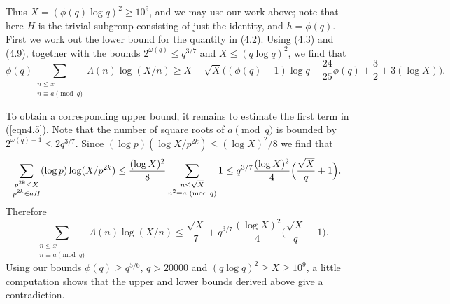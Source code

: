 \documentclass [12pt]{amsart}
\numberwithin{equation}{section}
\begin{document}
Thus $X= (\phi(q)\log q)^2 \ge 10^9$, and we may use our work above; note that here $H$ is the 
trivial subgroup consisting of just the identity, and $h=\phi(q)$.  First we work out the lower bound for the quantity in
 (4.2).   Using (4.3) and (4.9), together with the bounds $2^{\omega(q)}\le q^{3/7}$ and $X\le (q\log q)^2$, we 
 find that 
 $$
\phi(q) \sum_{\substack{{n\le x}\\ {n\equiv a\pmod q}}} \Lambda(n) \log(X/n) 
\ge X -\sqrt{X} \Big( (\phi(q)-1)\log q  - \frac{24}{25} \phi(q) + \frac 32 + 3(\log X)\Big). 
$$ 

To obtain a corresponding upper bound, it remains to estimate the first term in (\ref{eqn4.5}).  
Note that the number of square roots of $a \pmod q$ is bounded by $2^{\omega(q)+1} \le 2q^{3/7}$.  Since $(\log p)(\log X/p^{2k}) \le (\log X)^2/8$ we find that 
\begin{align}
\label{eqn:APup}
\sum_{\substack{p^{2k} \le X \\ p^{2k} \in aH }} (\log p) \log(X/p^{2k})
&\leq \frac{(\log X)^2}{8} \sum_{\substack{n \le \sqrt{X} \\ n^2 \equiv a \textup{ (mod $q$)} }} 1  
\leq  q^{3/7} \frac{(\log X)^2}{4} \Big(\frac{\sqrt{X}}{q}+1\Big). \notag
\end{align}
Therefore 
$$ 
\sum_{\substack{{n\le x}\\ {n\equiv a\pmod q}}} \Lambda(n) \log(X/n) \le 
\frac{\sqrt{X}}{7} +  q^{3/7} \frac{(\log X)^2}{4} \Big(\frac{\sqrt{X}}{q}+1\Big).
$$ 
Using our bounds $\phi(q)\ge q^{5/6}$, $q >20000$ and $(q\log q)^2 \geq X\ge 10^9$, a little computation shows that 
the upper and lower bounds derived above give a contradiction. 


\end{document}
